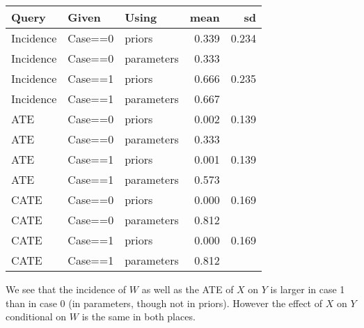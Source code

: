 \documentclass[
  12pt,
]{book}
\newenvironment{Shaded}{\begin{snugshade}}{\end{snugshade}}
\newcommand{\DataTypeTok}[1]{\textcolor[rgb]{0.13,0.29,0.53}{#1}}
\newcommand{\KeywordTok}[1]{\textcolor[rgb]{0.13,0.29,0.53}{\textbf{#1}}}
\newcommand{\NormalTok}[1]{#1}
\newcommand{\OperatorTok}[1]{\textcolor[rgb]{0.81,0.36,0.00}{\textbf{#1}}}
\newcommand{\OtherTok}[1]{\textcolor[rgb]{0.56,0.35,0.01}{#1}}
\newcommand{\StringTok}[1]{\textcolor[rgb]{0.31,0.60,0.02}{#1}}
\begin{document}
\begin{Shaded}
\end{Shaded}

\begin{tabular}{l|l|l|r|r}
\hline
Query & Given & Using & mean & sd\\
\hline
Incidence & Case==0 & priors & 0.339 & 0.234\\
\hline
Incidence & Case==0 & parameters & 0.333 & \\
\hline
Incidence & Case==1 & priors & 0.666 & 0.235\\
\hline
Incidence & Case==1 & parameters & 0.667 & \\
\hline
ATE & Case==0 & priors & 0.002 & 0.139\\
\hline
ATE & Case==0 & parameters & 0.333 & \\
\hline
ATE & Case==1 & priors & 0.001 & 0.139\\
\hline
ATE & Case==1 & parameters & 0.573 & \\
\hline
CATE & Case==0 & priors & 0.000 & 0.169\\
\hline
CATE & Case==0 & parameters & 0.812 & \\
\hline
CATE & Case==1 & priors & 0.000 & 0.169\\
\hline
CATE & Case==1 & parameters & 0.812 & \\
\hline
\end{tabular}

We see that the incidence of \(W\) as well as the ATE of \(X\) on \(Y\) is larger in case 1 than in case 0 (in parameters, though not in priors). However the effect of \(X\) on \(Y\) conditional on \(W\) is the same in both places.
\end{document}
